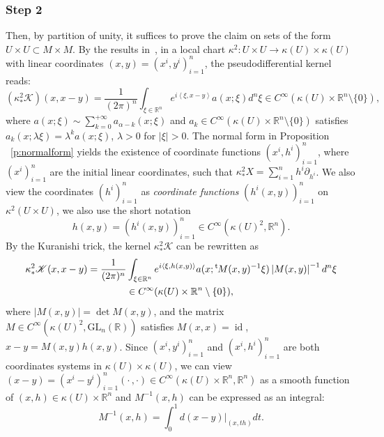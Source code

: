 \documentclass[10pt]{amsart}
\let\pazocal\mathscr
\theoremstyle{definition}
\newcommand{\GL}{\mathrm{GL}}
\let\cv\alpha
\let\asigma a
\let\euler X
\DeclareMathOperator\id{id}
\newcommand{\module}[1]{\left|#1\right|}
\newcommand{\step}[1]{\subsubsection*{Step #1}}
\renewcommand{\t}{{{}^{\mathrm{t}\mkern-2mu}}}
\begin{document}
\step{2} Then, by partition of unity, it suffices to prove the claim on sets
of the form $U\times U\subset M\times M$. By the results in~\cite{Lesch}, in a local chart $\kappa^2:U\times U\to \kappa(U)\times \kappa(U) $ with linear coordinates $(x,y)=(x^i,y^i)_{i=1}^n$, the pseudodifferential kernel reads:
\[
{\left(\kappa^2_*\pazocal{K}\right)}(x,x-y)=\frac{1}{(2\pi)^n}\int_{\xi\in \mathbb{R}^n} e^{i\left\langle \xi,x-y\right\rangle} \asigma(x;\xi) d^n\xi \in C^\infty(\kappa(U)\times \mathbb{R}^n\setminus\{0\}),
\]
where $\asigma(x;\xi)\sim \sum_{k=0}^{+\infty} \asigma_{\cv-k}(x;\xi)$ and
$\asigma_k\in C^\infty(\kappa(U) \times \mathbb{R}^n\setminus\{0\}) $
satisfies $\asigma_k(x;\lambda\xi)=\lambda^k\asigma(x;\xi)$, $\lambda>0$ for $\vert \xi\vert>0$.
{The normal form in Proposition ~\ref{p:normalform} yields the existence
of}
coordinate functions $(x^i,h^i)_{i=1}^n$, where $(x^i)_{i=1}^n$ are the initial linear coordinates, such that
$\kappa^2_*\euler=\sum_{i=1}^n h^i\partial_{h^i}$. We also view the coordinates $(h^i)_{i=1}^n$ as \emph{coordinate functions} $\left(h^i(x,y)\right)_{i=1}^n$
on $\kappa^2(U \times U)$, we also use the short notation
\[
h(x,y)=(h^i(x,y))_{i=1}^n\in C^\infty(\kappa(U)^2,\mathbb{R}^n).
\]
By the Kuranishi trick, the kernel
$\kappa^2_*\pazocal{K}$ can be rewritten as
\begin{multline*}
\kappa^2_*\pazocal{K}(x,x-y)=\frac{1}{(2\pi)^n}\int_{\xi\in \mathbb{R}^n} e^{i\left\langle \xi,h(x,y)\right\rangle} \asigma(x; \t M(x,y)^{-1} \xi) \module{M(x,y)}^{-1}d^n\xi \\ \in C^\infty(\kappa(U)\times \mathbb{R}^n\setminus\{0\}),
\end{multline*}
where $\module{M(x,y)}=\det{M(x,y)}$, and the matrix $M\in C^\infty(\kappa(U)^2,\GL_n(\mathbb{R}))$ satisfies $M(x,x)=\id$, $x-y=M(x,y)h(x,y)$. Since $(x^i,y^i)_{i=1}^n$ and $(x^i,h^i)_{i=1}^n$ are both coordinates systems in $\kappa(U)\times \kappa(U)$, we can view $(x-y)=(x^i-y^i)_{i=1}^n(\cdot\,,\cdot)\in C^\infty(\kappa(U)\times \mathbb{R}^n,\mathbb{R}^n)$
as a smooth function of $(x,h)\in \kappa(U)\times \mathbb{R}^n$
and $M^{-1}(x,h)$ can be expressed
as an integral:
\[
M^{-1}(x,h)=\int_0^1 d(x-y)|_{(x,th)} dt.
\]
\end{document}
